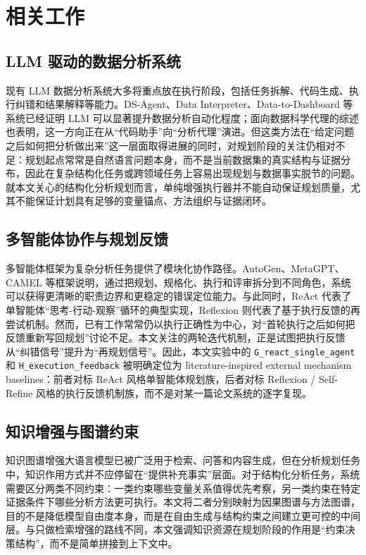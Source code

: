\section{相关工作}

\subsection{LLM 驱动的数据分析系统}

现有 LLM 数据分析系统大多将重点放在执行阶段，包括任务拆解、代码生成、执行纠错和结果解释等能力。DS-Agent、Data Interpreter、Data-to-Dashboard 等系统已经证明 LLM 可以显著提升数据分析自动化程度\citep{guo2024dsagent,hong2025data,zhang2025data}；面向数据科学代理的综述也表明，这一方向正在从“代码助手”向“分析代理”演进\citep{sun2025survey,zhao2024llm}。但这类方法在“给定问题之后如何把分析做出来”这一层面取得进展的同时，对规划阶段的关注仍相对不足：规划起点常常是自然语言问题本身，而不是当前数据集的真实结构与证据分布，因此在复杂结构化任务或跨领域任务上容易出现规划与数据事实脱节的问题。就本文关心的结构化分析规划而言，单纯增强执行器并不能自动保证规划质量，尤其不能保证计划具有足够的变量锚点、方法组织与证据闭环。

\subsection{多智能体协作与规划反馈}

多智能体框架为复杂分析任务提供了模块化协作路径。AutoGen、MetaGPT、CAMEL 等框架说明，通过把规划、规格化、执行和评审拆分到不同角色，系统可以获得更清晰的职责边界和更稳定的错误定位能力\citep{wu2023autogen,hong2024metagpt,li2023camel}。与此同时，ReAct 代表了单智能体“思考-行动-观察”循环的典型实现\citep{yao2023react}，Reflexion 则代表了基于执行反馈的再尝试机制\citep{shinn2024reflexion}。然而，已有工作常常仍以执行正确性为中心，对“首轮执行之后如何把反馈重新写回规划”讨论不足。本文关注的两轮迭代机制，正是试图把执行反馈从“纠错信号”提升为“再规划信号”。因此，本文实验中的 \texttt{G\_react\_single\_agent} 和 \texttt{H\_execution\_feedback} 被明确定位为 literature-inspired external mechanism baselines：前者对标 ReAct 风格单智能体规划族，后者对标 Reflexion / Self-Refine 风格的执行反馈机制族，而不是对某一篇论文系统的逐字复现。

\subsection{知识增强与图谱约束}

知识图谱增强大语言模型已被广泛用于检索、问答和内容生成\citep{liu2016knowledge,pan2024unifying,edge2024graphrag,mialon2023augmented,gao2023retrieval}，但在分析规划任务中，知识作用方式并不应停留在“提供补充事实”层面。对于结构化分析任务，系统需要区分两类不同约束：一类约束哪些变量关系值得优先考察，另一类约束在特定证据条件下哪些分析方法更可执行。本文将二者分别映射为因果图谱与方法图谱，目的不是降低模型自由度本身，而是在自由生成与结构约束之间建立更可控的中间层。与只做检索增强的路线不同，本文强调知识资源在规划阶段的作用是“约束决策结构”，而不是简单拼接到上下文中。

